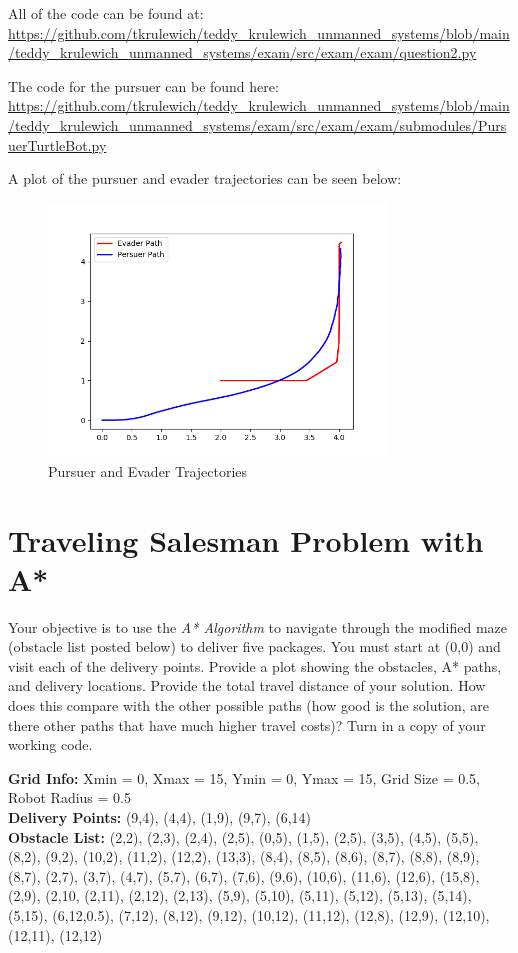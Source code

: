 \documentclass{article}
\begin{document}
All of the code can be found at: \\
\url{https://github.com/tkrulewich/teddy_krulewich_unmanned_systems/blob/main/teddy_krulewich_unmanned_systems/exam/src/exam/exam/question2.py}

The code for the pursuer can be found here: \\
\url{https://github.com/tkrulewich/teddy_krulewich_unmanned_systems/blob/main/teddy_krulewich_unmanned_systems/exam/src/exam/exam/submodules/PursuerTurtleBot.py}

A plot of the pursuer and evader trajectories can be seen below:

\begin{figure}[h]
\centering
\includegraphics[width=0.8\textwidth]{images/question2.png}
\caption{Pursuer and Evader Trajectories}
\end{figure}

\section{Traveling Salesman Problem with A*}

Your objective is to use the \textit{A* Algorithm} to navigate through the modified maze (obstacle list posted
below) to deliver five packages. You must start at (0,0) and visit each of the delivery points. Provide a
plot showing the obstacles, A* paths, and delivery locations. Provide the total travel distance of your
solution. How does this compare with the other possible paths (how good is the solution, are there other
paths that have much higher travel costs)? Turn in a copy of your working code.

\bigskip
\noindent\textbf{Grid Info:} Xmin = 0, Xmax = 15, Ymin = 0, Ymax = 15, Grid Size = 0.5, Robot Radius = 0.5 \\
\textbf{Delivery Points:} (9,4), (4,4), (1,9), (9,7), (6,14) \\
\textbf{Obstacle List:} (2,2), (2,3), (2,4), (2,5), (0,5), (1,5), (2,5), (3,5), (4,5), (5,5), (8,2), (9,2), (10,2), (11,2),
(12,2), (13,3), (8,4), (8,5), (8,6), (8,7), (8,8), (8,9), (8,7), (2,7), (3,7), (4,7), (5,7), (6,7), (7,6), (9,6),
(10,6), (11,6), (12,6), (15,8), (2,9), (2,10, (2,11), (2,12), (2,13), (5,9), (5,10), (5,11), (5,12), (5,13),
(5,14), (5,15), (6,12,0.5), (7,12), (8,12), (9,12), (10,12), (11,12), (12,8), (12,9), (12,10), (12,11), (12,12) \\
\end{document}
